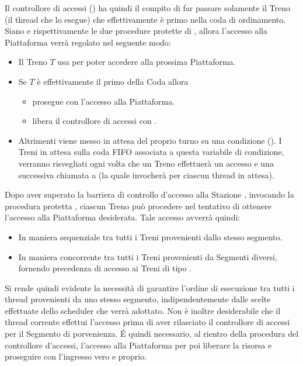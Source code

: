 \begin{description}
		Il controllore di accessi () ha quindi il compito di far passare solamente il Treno (il thread che lo esegue) che effettivamente è primo nella coda di ordinamento.
		Siano  e  rispettivamente le due procedure protette di , allora l'accesso alla Piattaforma verrà regolato nel seguente modo:
			\begin{itemize}
				\item Il Treno $T$ usa  per poter accedere alla prossima Piattaforma.
				\item Se $T$ è effettivamente il primo della Coda allora 
					\begin{itemize}
						\item prosegue con l'accesso alla Piattaforma. 
						\item libera il controllore di accessi  con . 
					\end {itemize}
				\item Altrimenti viene messo in attesa del proprio turno su una condizione (). I Treni in attesa sulla coda FIFO associata a questa variabile di condizione, verranno risvegliati ogni volta che un Treno effettuerà un accesso e una successiva chiamata a  (la quale invocherà  per ciascun thread in attesa).
			\end{itemize}
		
		
		\item{}
		
		Dopo aver superato la barriera di controllo d'accesso alla Stazione , invocando la procedura protetta , ciascun Treno può procedere nel tentativo di ottenere l'accesso alla Piattaforma desiderata. Tale accesso avverrà quindi:
		
		\begin{itemize}
			\item In maniera sequenziale tra tutti i Treni provenienti dallo stesso segmento.
			\item In maniera concorrente tra tutti i Treni provenienti da Segmenti diversi, fornendo precedenza di accesso ai Treni di tipo .
		\end{itemize}
		
		Si rende quindi evidente la necessità di garantire l'ordine di esecuzione tra tutti i thread provenienti da uno stesso segmento, indipendentemente dalle scelte effettuate dello scheduler che verrà adottato. Non è inoltre desiderabile che il thread corrente effettui l'accesso prima di aver rilasciato il controllore di accessi per il Segmento di porvenienza. \'E quindi necessario, al rientro della procedura  del controllore d'accessi,  l'accesso alla Piattaforma per poi liberare la risorsa  e proseguire con l'ingresso vero e proprio.
				  

\end{description}
